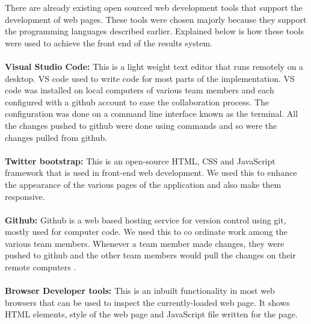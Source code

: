 There are already existing open sourced web development tools that support the development of web pages. These tools were chosen majorly because they support the programming languages described earlier. Explained below is how these tools were used to achieve the front end of the results system.\\~\\
\textbf{Visual Studio Code: }This is a light weight text editor that runs remotely on a desktop. VS code  used to write code for most parts of the implementation. VS code was installed on local computers of various team members and each configured with a github account to ease the collaboration process. The configuration was done on a command line interface known as the terminal. All the changes pushed to github were done using commands and so were the changes pulled from github.\\\\
\textbf{Twitter bootstrap: }This is an open-source HTML, CSS and JavaScript framework that is used in front-end web development. We used this to enhance the appearance of the various pages of the application and also make them responsive. \\\\
\textbf{Github: }Github is a web based hosting service for version control using git, mostly used for computer code. We used this to co ordinate work among the various team members. Whenever a team member made changes, they were pushed to github and the other team members would pull the changes on their remote computers \cite{art22}.\\~\\
\textbf{Browser Developer tools: }This is an inbuilt functionality in most web browsers that can be used to inspect the currently-loaded web page. It shows HTML elements, style of the web page and JavaScript file written for the page.

